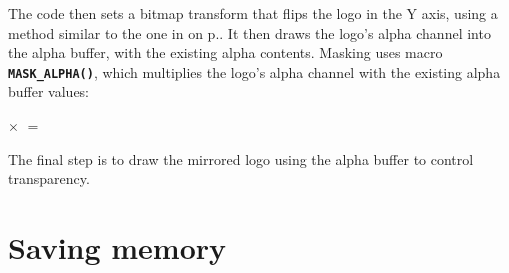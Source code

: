 \documentclass[10pt]{book}
\newcommand{\mach}[1]{\texttt{\textbf{#1}}}
\newcommand{\xref}[1]{\textit{\nameref{#1}} on  p.\pageref{#1}}
\begin{document}
The code then sets a bitmap transform that flips the logo in the Y axis,
using a method similar to the one in \xref{mirror}.
It then draws the logo's alpha channel into the alpha buffer,
with the existing alpha contents.
Masking uses macro \mach{MASK\_ALPHA()}, which multiplies the logo's alpha channel with the existing alpha buffer values:

\begin{center}
$\times$
$=$
\end{center}

\newpage
The final step is to draw the mirrored logo using the alpha buffer to control transparency.


\chapter{Saving memory}

\newpage
\end{document}
